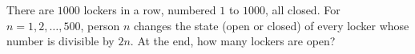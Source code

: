 There are $1000$ lockers in a row, numbered $1$ to $1000$, all closed. For $n=1,2,\dots,500$, person $n$ changes the state (open or closed) of every locker whose number is divisible by $2n$. At the end, how many lockers are open?
